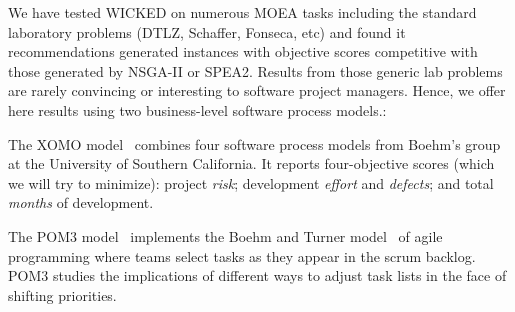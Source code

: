 We have tested WICKED on numerous MOEA tasks
including the standard laboratory problems (DTLZ, Schaffer, Fonseca, etc) and found
it recommendations generated instances with objective scores competitive with
those generated by NSGA-II or SPEA2. Results from those generic lab problems
are rarely convincing or interesting to software project managers. Hence, we offer
here results using two business-level software process models.:
\bi
\item
The XOMO model~\cite{me07f,me09a,me09e}
combines four software process models from
Boehm’s group at the University of Southern California.
It reports four-objective scores (which we will try to minimize):
project {\em risk};
development {\em effort} and {\em defects}; and total {\em months} of development.
\item
The POM3 model~\cite{port08,me09j}  implements the Boehm and Turner model~\cite{port08,1204376,turner03}
of agile programming
where teams select tasks as they appear in the scrum backlog.
POM3 studies the implications of different ways to adjust task lists in the face of shifting priorities.
\ei



